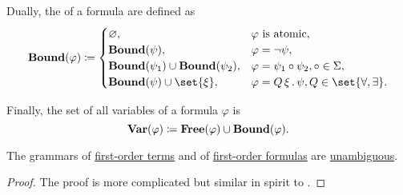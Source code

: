 \begin{definition}
\begin{thmenum}
     Dually, the  of a formula are defined as
    \begin{equation}\label{eq:def:first_order_syntax/formula_bound_variables}
      \boldop{Bound}(\varphi) \coloneqq \begin{cases}
        \varnothing,                                        &\varphi \text{ is atomic}, \\
        \boldop{Bound}(\psi),                               &\varphi = \neg \psi, \\
        \boldop{Bound}(\psi_1) \cup \boldop{Bound}(\psi_2), &\varphi = \psi_1 \bincirc \psi_2, \bincirc \in \Sigma, \\
        \boldop{Bound}(\psi) \cup \set{ \xi },              &\varphi = \quantifier{Q}{\xi} \psi, Q \in \set{ \forall, \exists }.
      \end{cases}
    \end{equation}

     Finally, the set of all variables of a formula \( \varphi \) is
    \begin{equation}\label{eq:def:first_order_syntax/formula_variables}
      \operatorname{\mathbf{Var}}(\varphi) \coloneqq \operatorname{\mathbf{Free}}(\varphi) \cup \operatorname{\mathbf{Bound}}(\varphi).
    \end{equation}
  \end{thmenum}
\end{definition}

\begin{proposition}\label{thm:first_order_terms_and_formulas_are_unambiguous}
  The grammars of \hyperref[def:first_order_syntax/term]{first-order terms} and of \hyperref[def:first_order_syntax/formula]{first-order formulas} are \hyperref[def:grammar_derivation/ambiguity]{unambiguous}.
\end{proposition}
\begin{proof}
  The proof is more complicated but similar in spirit to .
\end{proof}

